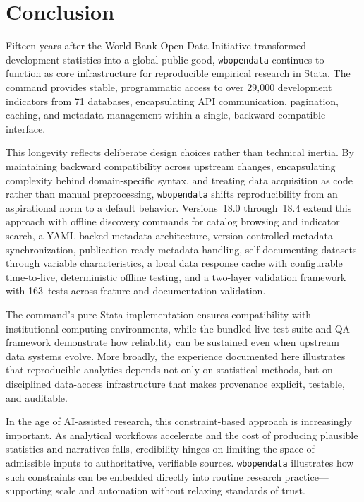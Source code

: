 \documentclass[bib]{statapress}
\begin{document}
\section{Conclusion}\label{sec:conclusion}

Fifteen years after the World Bank Open Data Initiative transformed development
statistics into a global public good, \texttt{wbopendata} continues to function
as core infrastructure for reproducible empirical research in Stata. The command
provides stable, programmatic access to over 29{,}000 development indicators from
71 databases, encapsulating API communication, pagination, caching, and metadata
management within a single, backward-compatible interface.

This longevity reflects deliberate design choices rather than technical inertia.
By maintaining backward compatibility across upstream changes, encapsulating
complexity behind domain-specific syntax, and treating data acquisition as code
rather than manual preprocessing, \texttt{wbopendata} shifts reproducibility from
an aspirational norm to a default behavior. Versions~18.0 through~18.4 extend this approach
with offline discovery commands for catalog browsing and indicator search,
a YAML-backed metadata architecture, version-controlled metadata synchronization,
publication-ready metadata handling, self-documenting datasets through variable
characteristics, a local data response cache with configurable time-to-live,
deterministic offline testing, and a two-layer validation framework
with 163~tests across feature and documentation validation.

The command’s pure-Stata implementation ensures compatibility with institutional
computing environments, while the bundled live test suite and QA framework
demonstrate how reliability can be sustained even when upstream data systems
evolve. More broadly, the experience documented here illustrates that reproducible
analytics depends not only on statistical methods, but on disciplined data-access
infrastructure that makes provenance explicit, testable, and auditable.

In the age of AI-assisted research, this constraint-based approach is increasingly
important. As analytical workflows accelerate and the cost of producing plausible
statistics and narratives falls, credibility hinges on limiting the space of
admissible inputs to authoritative, verifiable sources. \texttt{wbopendata}
illustrates how such constraints can be embedded directly into routine research
practice—supporting scale and automation without relaxing standards of trust.
\end{document}
